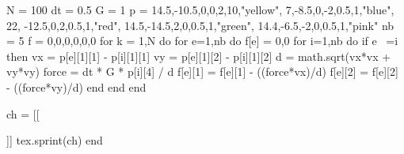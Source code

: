 \documentclass[12pt,a4paper,landscape]{article}
\begin{document}
\begin{luacode*}
	N = 100
		dt = 0.5
		    G = 1
			p = {
				{{14.5,-10.5},{0,0},2,10,"yellow"},
					{{7,-8.5},{0,-2},0.5,1,"blue"},
					    {{22, -12.5},{0,2},0.5,1,"red"},
						{{14.5,-14.5},{2,0},0.5,1,"green"},
						    {{14.4,-6.5},{-2,0},0.5,1,"pink"}
							}
							    nb = 5
								f = {{0,0},{0,0},{0,0}}
								    for k = 1,N do
											for e=1,nb do
														f[e] = {0,0}
																	for i=1,nb do
																					if e ~=i then
																										vx = p[e][1][1] - p[i][1][1]
																															vy = p[e][1][2] - p[i][1][2]
																																				d = math.sqrt(vx*vx + vy*vy)
																																									force = dt * G * p[i][4] / d
																																														f[e][1] = f[e][1] - ((force*vx)/d)
																																																			f[e][2] = f[e][2] - ((force*vy)/d)
																																																							end
																																																										end
																																																												end

																																																													ch = [[
																																																														\newpage
																																																																	\begin{tikzpicture}
																																																																		\draw (0,0) -- (30,-20);
																																																																					]]
																																																																						for e=1,nb do
																																																																							    p[e][2][1] = p[e][2][1] + f[e][1]
																																																																									p[e][2][2] = p[e][2][2] + f[e][2]
																																																																										    p[e][1][1] = p[e][1][1] + p[e][2][1]
																																																																												p[e][1][2] = p[e][1][2] + p[e][2][2]
																																																																													    ch = ch..[[
																																																																														    \fill[]]..p[e][5]..[[] (canvas cs:x=]]..p[e][1][1]..[[cm,y=]]..p[e][1][2]..[[cm) circle (]]..p[e][3]..[[);
																																																																																	    ]]
																																																																																		    end
																																																																																			    ch = ch..[[
																																																																	\end{tikzpicture}
																																																																																						    ]]
																																																																																							    tex.sprint(ch)
																																																																																								end
\end{luacode*}
\end{document}
